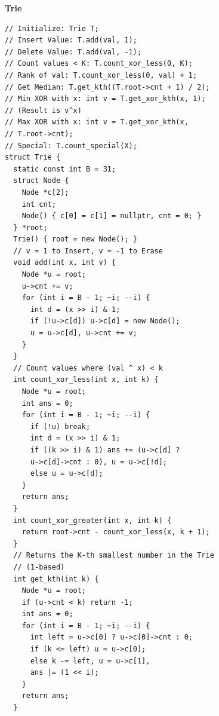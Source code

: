 \switchcolumn

\textbf{Trie}
\begin{lstlisting}
// Initialize: Trie T;
// Insert Value: T.add(val, 1);
// Delete Value: T.add(val, -1);
// Count values < K: T.count_xor_less(0, K);
// Rank of val: T.count_xor_less(0, val) + 1;
// Get Median: T.get_kth((T.root->cnt + 1) / 2);
// Min XOR with x: int v = T.get_xor_kth(x, 1);
// (Result is v^x)
// Max XOR with x: int v = T.get_xor_kth(x,
// T.root->cnt);
// Special: T.count_special(X);
struct Trie {
  static const int B = 31;
  struct Node {
    Node *c[2];
    int cnt;
    Node() { c[0] = c[1] = nullptr, cnt = 0; }
  } *root;
  Trie() { root = new Node(); }
  // v = 1 to Insert, v = -1 to Erase
  void add(int x, int v) {
    Node *u = root;
    u->cnt += v;
    for (int i = B - 1; ~i; --i) {
      int d = (x >> i) & 1;
      if (!u->c[d]) u->c[d] = new Node();
      u = u->c[d], u->cnt += v;
    }
  }
  // Count values where (val ^ x) < k
  int count_xor_less(int x, int k) {
    Node *u = root;
    int ans = 0;
    for (int i = B - 1; ~i; --i) {
      if (!u) break;
      int d = (x >> i) & 1;
      if ((k >> i) & 1) ans += (u->c[d] ?
      u->c[d]->cnt : 0), u = u->c[!d];
      else u = u->c[d];
    }
    return ans;
  }
  int count_xor_greater(int x, int k) {
    return root->cnt - count_xor_less(x, k + 1);
  }
  // Returns the K-th smallest number in the Trie
  // (1-based)
  int get_kth(int k) {
    Node *u = root;
    if (u->cnt < k) return -1;
    int ans = 0;
    for (int i = B - 1; ~i; --i) {
      int left = u->c[0] ? u->c[0]->cnt : 0;
      if (k <= left) u = u->c[0];
      else k -= left, u = u->c[1],
      ans |= (1 << i);
    }
    return ans;
  }
\end{lstlisting}

